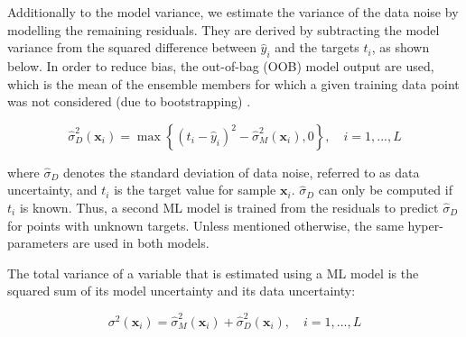 Additionally to the model variance, we estimate the variance of the data noise by modelling the remaining residuals. They are derived by subtracting the model variance from the squared difference between $\hat{y}_i$ and the targets $t_i$, as shown below.
In order to reduce bias, the out-of-bag (OOB) model output are used, which is the mean of the ensemble members for which a given training data point was not considered (due to bootstrapping) \cite{heskes_practical_1997}. 

\begin{equation}
\label{eq:data_unc}
  \hat{\sigma}_D^2 (\mathbf{x}_i) = \max \left\{ (t_i - \hat{y}_i)^2 - \hat{\sigma}_M^2 (\mathbf{x}_i) , 0 \right\}, \quad i=1,...,L
\end{equation}
 
 where $\hat{\sigma}_D$ denotes the standard deviation of data noise, referred to as data uncertainty, and $t_i$ is the target value for sample $\mathbf{x}_i$. 
$\hat{\sigma}_D$ can only be computed if $t_i$ is known. Thus, a second ML model is trained from the residuals to predict $\hat{\sigma}_D$ for points with unknown targets. Unless mentioned otherwise, the same hyper-parameters are used in both models.

The total variance of a variable that is estimated using a ML model is the squared sum of its model uncertainty and its data uncertainty: 

\begin{equation}
\label{eq:total_unc}
\sigma^2 (\mathbf{x}_i) = \hat{\sigma}_M^2 (\mathbf{x}_i) + \hat{\sigma}_D^2 (\mathbf{x}_i), \quad i=1,...,L
\end{equation}


